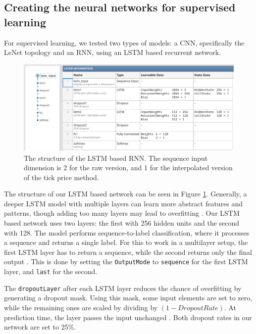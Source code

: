 \documentclass[a4paper,oneside,onecolumn,12pt]{book}
\begin{document}
	\subsection{Creating the neural networks for supervised learning}
	For supervised learning, we tested two types of models: a CNN, specifically the LeNet topology and an RNN, using an LSTM based recurrent network.

	\begin{figure}[H]
	\begin{center}
		\includegraphics[width=\linewidth]{kep/lstm_structure.png}
		\caption{The structure of the LSTM based RNN. The sequence input dimension is 2 for the raw version, and 1 for the interpolated version of the tick price method.}
		\label{fig:lstm_structure}
	\end{center}
	\end{figure}

	The structure of our LSTM based network can be seen in Figure \ref{fig:lstm_structure}. Generally, a deeper LSTM model with multiple layers can learn more abstract features and patterns, though adding too many layers may lead to overfitting \cite{DDIELL}. Our LSTM based network uses two layers: the first with 256 hidden units and the second with 128. The model performs sequence-to-label classification, where it processes a sequence and returns a single label. For this to work in a multilayer setup, the first LSTM layer has to return a sequence, while the second returns only the final output \cite{LSTMNN}. This is done by setting the \texttt{OutputMode} to \texttt{sequence} for the first LSTM layer, and \texttt{last} for the second.

	The \texttt{dropoutLayer} after each LSTM layer reduces the chance of overfitting by generating a dropout mask. Using this mask, some input elements are set to zero, while the remaining ones are scaled by dividing by $(1 - DropoutRate)$. At prediction time, the layer passes the input unchanged \cite{DL}. Both dropout rates in our network are set to 25\%.
\end{document}
